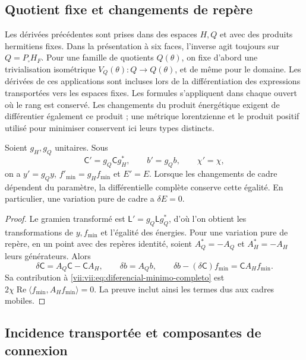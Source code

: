 \subsection{Quotient fixe et changements de repère}
\label{vii:vii:subsec:marcos-minimo}

Les dérivées précédentes sont prises dans des espaces \(H,Q\) et avec des produits hermitiens fixes. Dans la présentation à six faces, l'inverse agit toujours sur \(Q=P_\square H_F\). Pour une famille de quotients \(Q(\theta)\), on fixe d'abord une trivialisation isométrique \(V_Q(\theta):Q\to Q(\theta)\), et de même pour le domaine. Les dérivées de ces applications sont incluses lors de la différentiation des expressions transportées vers les espaces fixes. Les formules s'appliquent dans chaque ouvert où le rang est conservé. Les changements du produit énergétique exigent de différentier également ce produit ; une métrique lorentzienne et le produit positif utilisé pour minimiser conservent ici leurs types distincts.

\begin{proposition}
\label{vii:vii:prop:covariancia-minimo}
Soient \(g_H,g_Q\) unitaires. Sous
\[
 \mathsf C'=g_Q\mathsf C g_H^*,\qquad b'=g_Qb,\qquad \chi'=\chi,
\]
on a \(y'=g_Qy\), \(f'_{\min}=g_Hf_{\min}\) et \(E'=E\).
Lorsque les changements de cadre dépendent du paramètre, la différentielle
complète conserve cette égalité. En particulier, une variation pure de
cadre a \(\delta E=0\).
\end{proposition}

\begin{proof}
Le gramien transformé est \(\mathsf L'=g_Q\mathsf Lg_Q^*\),
d'où l'on obtient les transformations de \(y,f_{\min}\) et
l'égalité des énergies. Pour une variation pure de repère, en un point
avec des repères identité, soient \(A_Q^*=-A_Q\) et \(A_H^*=-A_H\)
leurs générateurs. Alors
\[
 \delta\mathsf C=A_Q\mathsf C-\mathsf C A_H,\qquad
 \delta b=A_Qb,\qquad
 \delta b-(\delta\mathsf C)f_{\min}=\mathsf C A_Hf_{\min}.
\]
Sa contribution à \eqref{vii:vii:eq:diferencial-minimo-completo} est
\(2\chi\operatorname{Re}\langle f_{\min},A_Hf_{\min}\rangle=0\).
La preuve inclut ainsi les termes dus aux cadres mobiles.
\end{proof}

\subsection{Incidence transportée et composantes de connexion}
\label{vii:vii:subsec:incidencia-conexion-minima}


